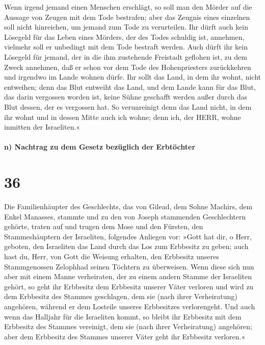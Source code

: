 Wenn irgend jemand einen Menschen erschlägt, so soll man
den Mörder auf die Aussage von Zeugen mit dem Tode bestrafen; aber das
Zeugnis eines einzelnen soll nicht hinreichen, um jemand zum Tode zu
verurteilen. Ihr dürft auch kein Lösegeld für das Leben
eines Mörders, der des Todes schuldig ist, annehmen, vielmehr soll er
unbedingt mit dem Tode bestraft werden. Auch dürft ihr
kein Lösegeld für jemand, der in die ihm zustehende Freistadt geflohen
ist, zu dem Zweck annehmen, daß er schon vor dem Tode des Hohenpriesters
zurückkehren und irgendwo im Lande wohnen dürfe. Ihr
sollt das Land, in dem ihr wohnt, nicht entweihen; denn das Blut
entweiht das Land, und dem Lande kann für das Blut, das darin vergossen
worden ist, keine Sühne geschafft werden außer durch das Blut dessen,
der es vergossen hat. So verunreinigt denn das Land
nicht, in dem ihr wohnt und in dessen Mitte auch ich wohne; denn ich,
der HERR, wohne inmitten der Israeliten.«

\hypertarget{n-nachtrag-zu-dem-gesetz-bezuxfcglich-der-erbtuxf6chter}{%
\paragraph{n) Nachtrag zu dem Gesetz bezüglich der
Erbtöchter}\label{n-nachtrag-zu-dem-gesetz-bezuxfcglich-der-erbtuxf6chter}}

\hypertarget{section-35}{%
\section{36}\label{section-35}}

Die Familienhäupter des Geschlechts, das von Gilead, dem
Sohne Machirs, dem Enkel Manasses, stammte und zu den von Joseph
stammenden Geschlechtern gehörte, traten auf und trugen dem Mose und den
Fürsten, den Stammeshäuptern der Israeliten, folgendes
Anliegen vor: »Gott hat dir, o Herr, geboten, den Israeliten das Land
durch das Los zum Erbbesitz zu geben; auch hast du, Herr, von Gott die
Weisung erhalten, den Erbbesitz unseres Stammgenossen Zelophhad seinen
Töchtern zu überweisen. Wenn diese sich nun aber mit einem
Manne verheiraten, der zu einem andern Stamme der Israeliten gehört, so
geht ihr Erbbesitz dem Erbbesitz unserer Väter verloren und wird zu dem
Erbbesitz des Stammes geschlagen, dem sie (nach ihrer Verheiratung)
angehören, während er dem Losteile unseres Erbbesitzes verlorengeht.
Und auch wenn das Halljahr für die Israeliten kommt, so
bleibt ihr Erbbesitz mit dem Erbbesitz des Stammes vereinigt, dem sie
(nach ihrer Verheiratung) angehören; aber dem Erbbesitz des Stammes
unserer Väter geht ihr Erbbesitz verloren.«

